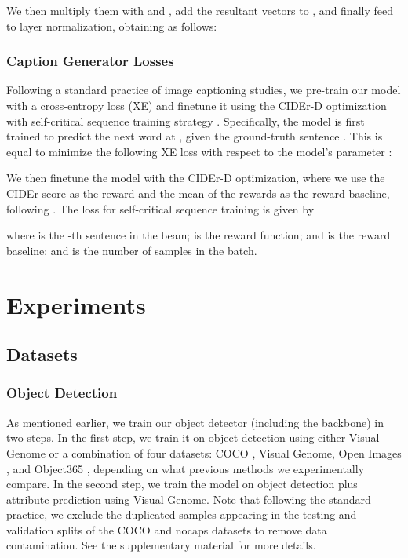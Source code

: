 \documentclass[runningheads]{llncs}
\begin{document}
We then multiply them with  and , add the resultant vectors to , and finally feed to layer normalization, obtaining  as follows:

\subsubsection{Caption Generator Losses}
Following a standard practice of image captioning studies, we pre-train our model with a cross-entropy loss (XE) and finetune it using the CIDEr-D optimization with self-critical sequence training strategy \cite{rennie2017self}. 
Specifically, the model is first trained to predict the next word  at , given the ground-truth sentence . This is equal to minimize the following XE loss with respect to the model's parameter :

We then finetune the model with the CIDEr-D optimization, where we use the CIDEr score as the reward and the mean of the rewards as the reward baseline, following \cite{cornia2020meshed}.
The loss for self-critical sequence training is given by

where  is the -th sentence in the beam;  is the reward function; and  is the reward baseline; and  is the number of samples in the batch. 

\section{Experiments}
\subsection{Datasets}
\subsubsection{Object Detection}

As mentioned earlier, we train our object detector (including the backbone) in two steps. In the first step, we train it on object detection using either Visual Genome \cite{krishnavisualgenome} or a combination \cite{zhang2021vinvl} of four datasets: COCO \cite{lin2014microsoft}, Visual Genome, Open Images \cite{OpenImages}, and Object365 \cite{shao2019objects365}, depending on what previous methods we experimentally compare. In the second step, we train the model on object detection plus attribute prediction using Visual Genome. 
Note that following the standard practice, we exclude the duplicated samples appearing in the testing and validation splits of the COCO and {nocaps} \cite{agrawal2019nocaps} datasets to remove data contamination. See the supplementary material for more details.
\end{document}
